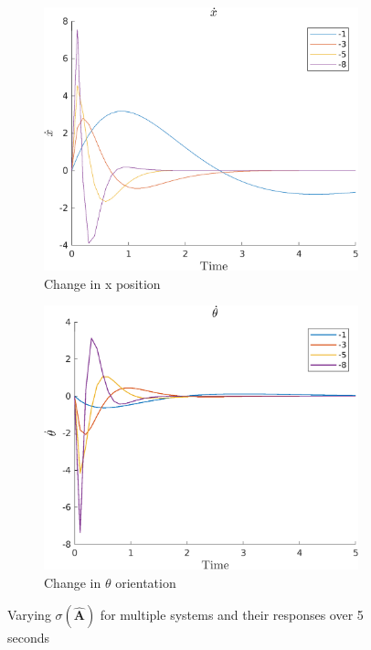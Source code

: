 \documentclass{article}
\begin{document}
\begin{figure}[H]
    \begin{subfigure}{0.45\textwidth}
        \centering
        \includegraphics[width = \textwidth]{figures/xdot_plot.png}
        \caption{Change in x position}
    \end{subfigure}
    \begin{subfigure}{0.45\textwidth}
        \centering
        \includegraphics[width = \textwidth]{figures/thetadot_plot.png}
        \caption{Change in $\theta$ orientation}
    \end{subfigure}
    \caption{Varying $\sigma(\hat{\boldsymbol{A}})$ for multiple systems and their responses over 5 seconds}
    \label{fig:part-2_results}
\end{figure}
\end{document}
